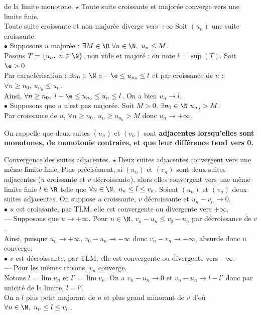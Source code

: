 \documentclass[11pt]{article}
\begin{document}

\begin{thm}{de la limite monotone. $\star$}{}
    Toute suite croissante et majorée converge vers une limite finie.\\
    Toute suite croissante et non majorée diverge vers $+\infty$
    \tcblower
    Soit $(u_n)$ une suite croissante.\\
    $\bullet$ Supposons $u$ majorée : $\exists M \in \R ~ \forall n \in \N, ~ u_n \leq M$.\\
    Posons $T=\{u_n, ~ n \in \N\}$, non vide et majoré : on note $l=\sup(T)$. Soit $\e>0$.\\
    Par caractérisation : $\exists n_0 \in \N ~ s - \e \leq u_{n_0} \leq l$ et par croissance de $u$ : $\forall n \geq n_0, ~ u_{n_0} \leq u_n$.\\
    Ainsi, $\forall n \geq n_0, ~ l - \e \leq u_{n_0} \leq u_n \leq l$. On a bien $u_n\to l$.\\
    $\bullet$ Supposons que $u$ n'est pas majorée. Soit $M>0$, $\exists n_0 \in \N ~ u_{n_0} > M$.\\
    Par croissance de $u$, $\forall n \geq n_0, ~ u_n \geq u_{n_0} > M$ donc $u_n\to+\infty$. 
\end{thm}

\quad On rappelle que deux suites $(u_n)$ et $(v_n)$ sont \bf{adjacentes} lorsqu'elles sont monotones, de monotonie contraire, et que leur différence tend vers 0.

\begin{thm}{Convergence des suites adjacentes. $\star$}{}
    Deux suites adjacentes convergent vers une même limite finie.\n
    Plus précisément, si $(u_n)$ et $(v_n)$ sont deux suites adjacentes ($u$ croissante et $v$ décroissante), alors elles convergent vers une même limite finie $l\in\R$ telle que $\forall n \in \N, ~ u_n \leq l \leq v_n$.
    \tcblower
    Soient $(u_n)$ et $(v_n)$ deux suites adjacentes. On suppose $u$ croissante, $v$ décroissante et $u_n-v_n\to0$.\\
    $\bullet$ $u$ est croissante, par TLM, elle est convergente ou divergente vers $+\infty$.\\
    --- Supposons que $u\to+\infty$. Pour $n\in\N$, $v_n-u_n\leq v_0 - u_n$ par décroissance de $v$.\\
    \hspace*{0.35cm} Ainsi, puisque $u_n\to+\infty$, $v_0-u_n\to-\infty$ donc $v_n-v_n\to-\infty$, absurde donc $u$ converge.\\
    $\bullet$ $v$ est décroissante, par TLM, elle est convergente ou divergente vers $-\infty$.\\
    --- Pour les mêmes raisons, $v_n$ converge.\\
    Notons $l=\lim u_n$ et $l'=\lim v_n$. On a $v_n-u_n\to0$ et $v_n-u_n\to l-l'$ donc par unicité de la limite, $l=l'$.\\
    On a $l$ plus petit majorant de $u$ et plus grand minorant de $v$ d'où $\forall n \in \N, ~ u_n \leq l \leq v_n$.
\end{thm}
\end{document}
